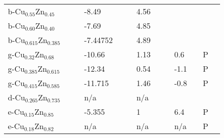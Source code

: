 \begin{landscape}
\begin{center}
\begin{longtable}{|l|p{2.5cm}|l|p{2.5cm}|l|l|p{2.5cm}|l|l|p{2.5cm}|l|l|l|}
b-Cu$_{0.55}$Zn$_{0.45} $  &                            &     & -8.49               &     & \citep{KubaschewskiCatterallJohnAshley.1956}     & 4.56               &     & \citep{KubaschewskiCatterallJohnAshley.1956} &                                     &     &     &  \\
b-Cu$_{0.60}$Zn$_{0.40} $  &                            &     & -7.69               &     & \citep{KubaschewskiCatterallJohnAshley.1956}     & 4.85               &     & \citep{KubaschewskiCatterallJohnAshley.1956} &                                     &     &     &  \\
b-Cu$_{0.615}$Zn$_{0.385}$ &                            &     & -7.44752            &     & \citep{KubaschewskiCatterallJohnAshley.1956}     & 4.89               &     & \citep{KubaschewskiCatterallJohnAshley.1956} &                                     &     &     &  \\
g-Cu$_{0.32}$Zn$_{0.68} $  &                            &     & -10.66              &     & \citep{KubaschewskiCatterallJohnAshley.1956}     & 1.13               &     & \citep{KubaschewskiCatterallJohnAshley.1956} & 0.6                                 &     & P   &  \\
g-Cu$_{0.385}$Zn$_{0.615}$ &                            &     & -12.34              &     & \citep{KubaschewskiCatterallJohnAshley.1956}     & 0.54               &     & \citep{KubaschewskiCatterallJohnAshley.1956} & -1.1                               &     & P   &  \\
g-Cu$_{0.415}$Zn$_{0.585}$ &                            &     & -11.715             &     & \citep{KubaschewskiCatterallJohnAshley.1956}     & 1.46               &     & \citep{KubaschewskiCatterallJohnAshley.1956} & -0.8                              &     & P   &  \\
d-Cu$_{0.265}$Zn$_{0.735}$ &                            &     & n/a                 &     & \citep{KubaschewskiCatterallJohnAshley.1956}     & n/a                &     & \citep{KubaschewskiCatterallJohnAshley.1956} &                                     &     &     &  \\
e-Cu$_{0.15}$Zn$_{0.85} $  &                            &     & -5.355              &     & \citep{KubaschewskiCatterallJohnAshley.1956}     & 1                  &     & \citep{KubaschewskiCatterallJohnAshley.1956} & 6.4                                 &     & P   &  \\
e-Cu$_{0.18}$Zn$_{0.82} $  &                            &     & n/a                 &     & \citep{KubaschewskiCatterallJohnAshley.1956}     & n/a                &     & \citep{KubaschewskiCatterallJohnAshley.1956} & n/a                                 &     & P   &  \\

\end{longtable}
\end{center}
\end{landscape}
